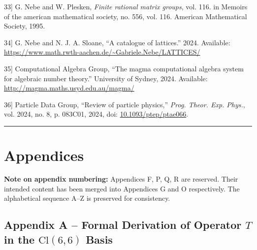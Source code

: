 \documentclass[11pt]{article}
\newlength{\cslhangindent}
\newenvironment{CSLReferences}[2]%
{\par
\noindent\setlength{\parindent}{0pt}}%
{\par}
\newcommand{\CSLLeftMargin}[1]{\hspace*{\cslhangindent}#1}
\newcommand{\CSLRightInline}[1]{#1}
\begin{document}
\begin{CSLReferences}{0}{0}
\leavevmode{}%
\CSLLeftMargin{{[}33{]} }
\CSLRightInline{G. Nebe and W. Plesken, \emph{Finite rational matrix
groups}, vol. 116. in Memoirs of the american mathematical society, no.
556, vol. 116. American Mathematical Society, 1995.}

\leavevmode{}%
\CSLLeftMargin{{[}34{]} }
\CSLRightInline{G. Nebe and N. J. A. Sloane, {``A catalogue of
lattices.''} 2024. Available:
\url{https://www.math.rwth-aachen.de/~Gabriele.Nebe/LATTICES/}}

\leavevmode{}%
\CSLLeftMargin{{[}35{]} }
\CSLRightInline{Computational Algebra Group, {``The magma computational
algebra system for algebraic number theory.''} University of Sydney,
2024. Available: \url{http://magma.maths.usyd.edu.au/magma/}}

\leavevmode{}%
\CSLLeftMargin{{[}36{]} }
\CSLRightInline{Particle Data Group, {``Review of particle physics,''}
\emph{Prog. Theor. Exp. Phys.}, vol. 2024, no. 8, p. 083C01, 2024, doi:
\href{https://doi.org/10.1093/ptep/ptae066}{10.1093/ptep/ptae066}.}

\end{CSLReferences}

\begin{center}\rule{0.5\linewidth}{0.5pt}\end{center}

\hypertarget{appendices}{%
\section{Appendices}\label{appendices}}

\textbf{Note on appendix numbering:} Appendices F, P, Q, R are reserved.
Their intended content has been merged into Appendices G and O
respectively. The alphabetical sequence A--Z is preserved for
consistency.

\hypertarget{appendix-a-formal-derivation-of-operator-t-in-the-textcl66-basis}{%
\subsection{\texorpdfstring{Appendix A -- Formal Derivation of Operator
\(T\) in the \(\text{Cl}(6,6)\)
Basis}{Appendix A -- Formal Derivation of Operator T in the \textbackslash text\{Cl\}(6,6) Basis}}\label{appendix-a-formal-derivation-of-operator-t-in-the-textcl66-basis}}
\end{document}
